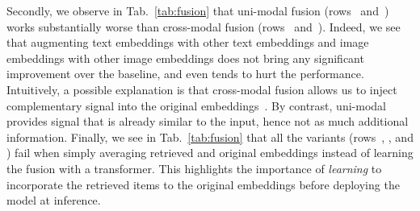 Secondly, we observe in Tab.~\ref{tab:fusion} that uni-modal fusion (rows~ and~) works substantially worse than cross-modal fusion (rows~ and~).
Indeed, we see that augmenting text embeddings with other text embeddings and image embeddings with other image embeddings does not bring any significant improvement over the baseline, and even tends to hurt the performance.
Intuitively, a possible explanation is that cross-modal fusion allows us to inject complementary signal into the original embeddings~\cite{iscen2023improving}.
By contrast, uni-modal provides signal that is already similar to the input, hence not as much additional information.
Finally, we see in Tab.~\ref{tab:fusion} that all the variants (rows~, ,  and ) fail when simply averaging retrieved and original embeddings instead of learning the fusion with a transformer.
This highlights the importance of \emph{learning} to incorporate the retrieved items to the original embeddings before deploying the model at inference.



